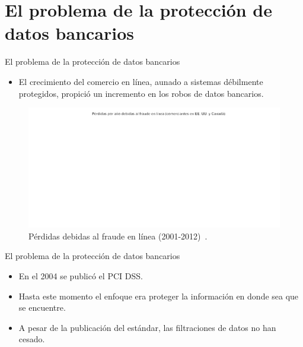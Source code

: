 %
%

\section{El problema de la protección de datos bancarios}

\begin{frame}{El problema de la protección de datos bancarios}
  \begin{itemize}
    \item El crecimiento del comercio en línea, aunado a sistemas débilmente
      protegidos, propició un incremento en los robos de datos bancarios.
  \end{itemize}

  \begin{figure}[H]
    \centering
    \includegraphics[width=0.9\linewidth]
       {diagramas_comunes/intro/perdidas_fraude_bn.png}
    \caption{Pérdidas debidas al fraude en línea (2001-2012)~\cite{wallethub}.}
  \end{figure}
\end{frame}

\begin{frame}{El problema de la protección de datos bancarios}
  \begin{itemize}
    \item En el 2004 se publicó el PCI DSS\footnotemark \cite{pci_dss}.
    \item Hasta este momento el enfoque era proteger la información en donde
      sea que se encuentre.
    \item A pesar de la publicación del estándar, las filtraciones de datos
      no han cesado.
  \end{itemize}
\end{frame}
